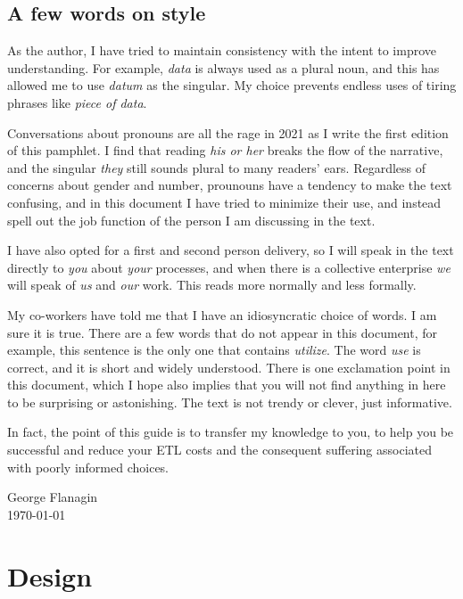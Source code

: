 \documentclass[11pt,letterpaper,twosided]{memoir}
\begin{document}
\section{A few words on style}

As the author, I have tried to maintain consistency with the intent
to improve understanding. For example, \emph{data} is always used
as a plural noun, and this has allowed me to use \emph{datum} as
the singular. My choice prevents endless uses of tiring phrases like
\emph{piece of data}.

Conversations about pronouns are all the rage in 2021 as I write
the first edition of this pamphlet. I find that reading \emph{his
or her} breaks the flow of the narrative, and the singular \emph{they}
still sounds plural to many readers' ears. Regardless of concerns
about gender and number, prounouns have a tendency to make the text
confusing, and in this document I have tried to minimize their use,
and instead spell out the job function of the person I am discussing
in the text.

I have also opted for a first and second person delivery, so I will
speak in the text directly to \emph{you} about \emph{your} processes,
and when there is a collective enterprise \emph{we} will speak of
\emph{us} and \emph{our} work. This reads more normally and less
formally.

My co-workers have told me that I have an idiosyncratic choice of
words. I am sure it is true. There are a few words that do not appear 
in this document, for example, this sentence is the only one that
contains \emph{utilize}. The word \emph{use} is correct, and it is
short and widely understood. There is one exclamation point in
this document, which I hope also implies that you will not find
anything in here to be surprising or astonishing. The text is not
trendy or clever, just informative.

In fact, 
the point of this guide is to transfer my knowledge to you, to help
you be successful and reduce your ETL costs and the consequent 
suffering associated with poorly informed choices.

\begin{flushright}George Flanagin\\\today\end{flushright}

\mainmatter
\chapter{Design}
\end{document}
